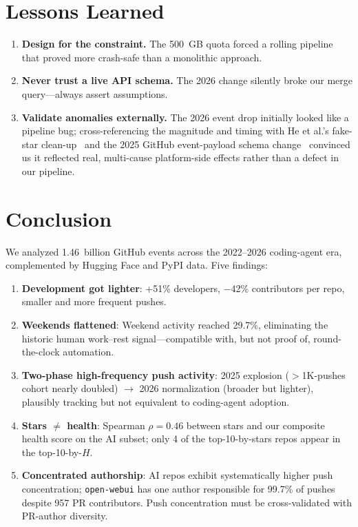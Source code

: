 \documentclass[11pt,twocolumn]{article}
\begin{document}
\section{Lessons Learned}\label{sec:lessons}

\begin{enumerate}[nosep]
  \item \textbf{Design for the constraint.} The 500~GB quota forced a rolling pipeline that proved more crash-safe than a monolithic approach.
  \item \textbf{Never trust a live API schema.} The 2026 change silently broke our merge query---always assert assumptions.
  \item \textbf{Validate anomalies externally.} The 2026 event drop initially looked like a pipeline bug; cross-referencing the magnitude and timing with He et al.'s fake-star clean-up~\cite{he2024fakestars} and the 2025 GitHub event-payload schema change~\cite{ghchangelog2025} convinced us it reflected real, multi-cause platform-side effects rather than a defect in our pipeline.
\end{enumerate}

\section{Conclusion}\label{sec:conclusion}

We analyzed 1.46~billion GitHub events across the 2022--2026 coding-agent era, complemented by Hugging Face and PyPI data.
Five findings:

\begin{enumerate}[nosep]
  \item \textbf{Development got lighter}: +51\% developers, $-$42\% contributors per repo, smaller and more frequent pushes.
  \item \textbf{Weekends flattened}: Weekend activity reached 29.7\%, eliminating the historic human work--rest signal---compatible with, but not proof of, round-the-clock automation.
  \item \textbf{Two-phase high-frequency push activity}: 2025 explosion ($>$1K-pushes cohort nearly doubled) $\rightarrow$ 2026 normalization (broader but lighter), plausibly tracking but not equivalent to coding-agent adoption.
  \item \textbf{Stars $\neq$ health}: Spearman $\rho = 0.46$ between stars and our composite health score on the AI subset; only 4 of the top-10-by-stars repos appear in the top-10-by-$H$.
  \item \textbf{Concentrated authorship}: AI repos exhibit systematically higher push concentration; \texttt{open-webui} has one author responsible for 99.7\% of pushes despite 957 PR contributors. Push concentration must be cross-validated with PR-author diversity.
\end{enumerate}
\end{document}
